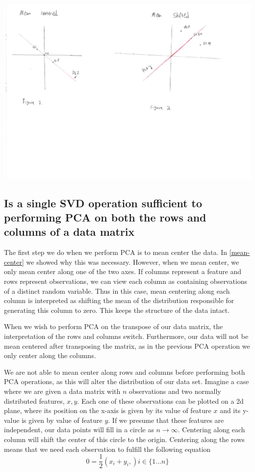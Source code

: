 \documentclass[11pt,a4paper,landscape]{article}
\begin{document}
\includegraphics[width=\textwidth]{figure1_2.pdf}

\subsection{Is a single SVD operation sufficient to performing PCA on both the rows and columns of a data matrix}
\label{svd}

The first step we do when we perform PCA is to mean center the data. In \ref{mean-center} we showed why this was necessary. However, when we mean center, we only mean center along one of the two axes. If columns represent a feature and rows represent observations, we can view each column as containing observations of a distinct random variable. Thus in this case, mean centering along each column is interpreted as shifting the mean of the distribution responsible for generating this column to zero. This keeps the structure of the data intact.\newline

When we wish to perform PCA on the transpose of our data matrix, the interpretation of the rows and columns switch. Furthermore, our data will not be mean centered after transposing the matrix, as in the previous PCA operation we only center along the columns.\newline

We are not able to mean center along rows and columns before performing both PCA operations, as this will alter the distribution of our data set. Imagine a case where we are given a data matrix with $ n $ observations and two normally distributed features, $x, y$. Each one of these observations can be plotted on a 2d plane, where its position on the x-axis is given by its value of feature $ x $ and its y-value is given by value of feature $ y $. If we presume that these features are independent, our data points will fill in a circle as $ n \rightarrow  \infty $. Centering along each column will shift the center of this circle to the origin. Centering along the rows means that we need each observation to fulfill the following equation
$$ 0 = \frac{1}{2} (x_{i} + y_{i},) i \in \lbrace 1 ...  n\rbrace $$
\end{document}
